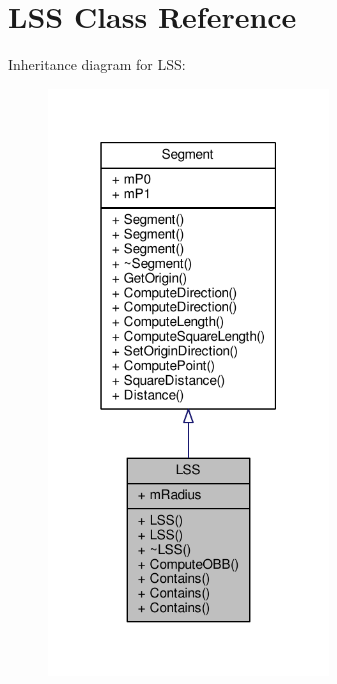 \hypertarget{classLSS}{}\section{L\+SS Class Reference}
\label{classLSS}


Inheritance diagram for L\+SS\+:
\nopagebreak
\begin{figure}[H]
\begin{center}
\leavevmode
\includegraphics[width=211pt]{d7/dae/classLSS__inherit__graph}
\end{center}
\end{figure}


